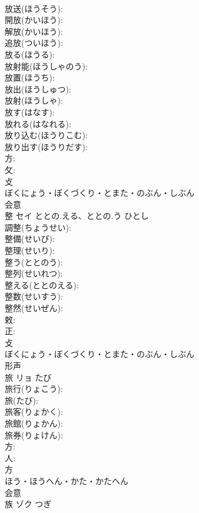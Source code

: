 \documentclass[8pt]{extreport}
\begin{document}
\begin{CJK}{UTF8}{min}
\\	放送(ほうそう): 
\\	開放(かいほう): 
\\	解放(かいほう): 
\\	追放(ついほう): 
\\	放る(ほうる): 
\\	放射能(ほうしゃのう): 
\\	放置(ほうち): 
\\	放出(ほうしゅつ): 
\\	放射(ほうしゃ): 
\\	放す(はなす): 
\\	放れる(はなれる): 
\\	放り込む(ほうりこむ): 
\\	放り出す(ほうりだす): 
\\	方: 
\\	攵: 
\\	攴	
\\	ぼくにょう・ぼくづくり・とまた・のぶん・しぶん	
\\	会意 
\\	整	セイ	ととの.える、ととの.う	ひとし	
\\	調整(ちょうせい): 
\\	整備(せいび): 
\\	整理(せいり): 
\\	整う(ととのう): 
\\	整列(せいれつ): 
\\	整える(ととのえる): 
\\	整数(せいすう): 
\\	整然(せいぜん): 
\\	敕: 
\\	正: 
\\	攴	
\\	ぼくにょう・ぼくづくり・とまた・のぶん・しぶん	
\\	形声 
\\	旅	リョ	たび		
\\	旅行(りょこう): 
\\	旅(たび): 
\\	旅客(りょかく): 
\\	旅館(りょかん): 
\\	旅券(りょけん): 
\\	方: 
\\	人: 
\\	方	
\\	ほう・ほうへん・かた・かたへん	
\\	会意 
\\	族	ゾク		つぎ	

\end{CJK}
\end{document}
